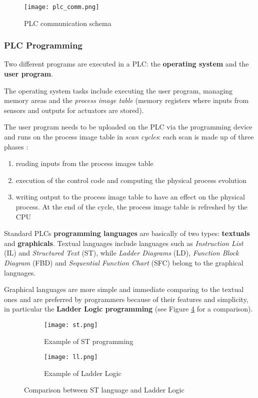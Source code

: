 \begin{figure}[h]
	\centering
	\texttt{[image: plc\_comm.png]}
	\caption{PLC communication schema}
	\label{fig:PLC_comm}
\end{figure}

\subsubsection{PLC Programming}
\label{subsubsec:plc_programming}
Two different programs are executed in a PLC: the \textbf{operating system} and the \textbf{user program}.

\bigskip
The operating system tasks include executing the user program, managing memory areas and the \textit{process image table} (memory registers where inputs from sensors and outputs for actuators are stored).

\bigskip
The user program needs to be uploaded on the PLC via the programming device and runs on the process image table in \textit{scan cycles}: each scan is made up of three phases \cite{ceccato}:

\begin{enumerate}
	\item reading inputs from the process images table
	\item execution of the control code and computing the physical process evolution
	\item writing output to the process image table to have an effect on the physical process. At the end of the cycle, the process image table is refreshed by the CPU
\end{enumerate}

Standard PLCs \textbf{programming languages} are basically of two types: \textbf{textuals} and \textbf{graphicals}.
Textual languages include languages such as \textit{Instruction List} (IL) and \textit{Structured Text} (ST), while \textit{Ladder Diagrams} (LD), \textit{Function Block Diagram} (FBD) and \textit{Sequential Function Chart} (SFC) belong to the graphical languages.

\bigskip
Graphical languages are more simple and immediate comparing to the textual ones and are preferred by programmers because of their features and simplicity, in particular the \textbf{Ladder Logic programming} (see Figure \ref{fig:st_ll_comparison} for a comparison).

\begin{figure}[h]
	\centering
	\begin{subfigure}{0.47\textwidth}
		\texttt{[image: st.png]}
		\caption{Example of ST programming}
		\label{subfig:st_example}
	\end{subfigure}
	\hfill
	\begin{subfigure}{0.47\textwidth}
		\texttt{[image: ll.png]}
		\caption{Example of Ladder Logic}
		\label{subfig:ladder_logic_example}
	\end{subfigure}
	\caption{Comparison between ST language and Ladder Logic}
	\label{fig:st_ll_comparison}
	
\end{figure}

